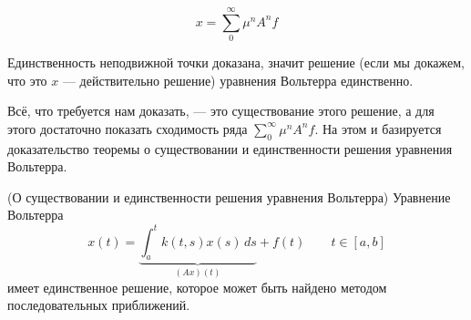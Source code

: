 \documentclass[12pt]{article}
\begin{document}
		$$x = \sum_0^{\infty} \mu^nA^n f$$

		Единственность неподвижной точки доказана, значит решение (если мы докажем, что это $x$ --- действительно решение) уравнения Вольтерра единственно.

		Всё, что требуется нам доказать, --- это существование этого решение, а для этого достаточно показать сходимость ряда $\sum_0^{\infty} \mu^nA^n f$. На этом и базируется доказательство теоремы о существовании и единственности решения уравнения Вольтерра.
	
		\begin{theorem}
			(О существовании и единственности решения уравнения Вольтерра)
			Уравнение Вольтерра
			$$x(t) = \underbrace{\int_a^t k(t,s) x(s) \, ds}_{(Ax)(t)} + f(t) \qquad t\in [a,b]$$
			имеет единственное решение, которое может быть найдено методом последовательных приближений.
		\end{theorem}		
	
\end{document}
